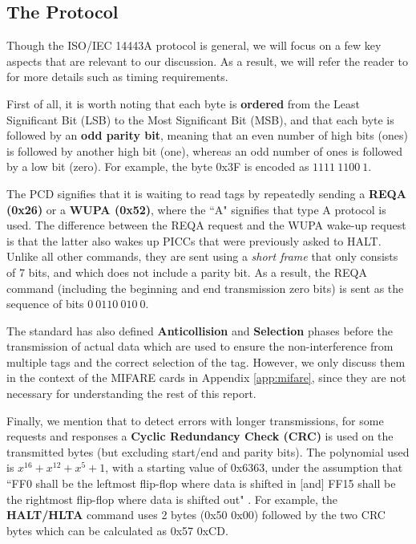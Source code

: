 \documentclass[fleqn,10pt]{SelfArx} %
\begin{document}
\subsection{The Protocol}
\label{subsec:protocol}

Though the ISO/IEC 14443A protocol is general, we will focus on a few key aspects that are relevant to our discussion. As a result, we will refer the reader to \cite{iso144433} for more details such as timing requirements.

First of all, it is worth noting that each byte is {\bf ordered} from the Least Significant Bit (LSB) to the Most Significant Bit (MSB), and that each byte is followed by an {\bf odd parity bit}, meaning that an even number of high bits (ones) is followed by another high bit (one), whereas an odd number of ones is followed by a low bit (zero). For example, the byte 0x3F is encoded as $1111\ 1100\ 1$.

The PCD signifies that it is waiting to read tags by repeatedly sending a {\bf REQA (0x26)} or a {\bf WUPA (0x52)}, where the ``A" signifies that type A protocol is used. The difference between the REQA request and the WUPA wake-up request is that the latter also wakes up PICCs that were previously asked to HALT. Unlike all other commands, they are sent using a {\em short frame} that only consists of 7 bits, and which does not include a parity bit. As a result, the REQA command (including the beginning and end transmission zero bits) is sent as the sequence of bits $0\ 0110\ 010\ 0$.

The standard has also defined {\bf Anticollision} and {\bf Selection} phases before the transmission of actual data which are used to ensure the non-interference from multiple tags and the correct selection of the tag. However, we only discuss them in the context of the MIFARE cards in Appendix \ref{app:mifare}, since they are not necessary for understanding the rest of this report. 

Finally, we mention that to detect errors with longer transmissions, for some requests and responses a {\bf Cyclic Redundancy Check (CRC)} is used on the transmitted bytes (but excluding start/end and parity bits). The polynomial used is $x^{16}+x^{12}+x^5+1$, with a starting value of 0x6363, under the assumption that ``FF0 shall be the leftmost flip-flop where data is shifted in  [and] FF15 shall be the rightmost flip-flop where data is shifted out" \cite{iso144433}. For example, the {\bf HALT/HLTA} command uses 2 bytes (0x50 0x00) followed by the two CRC bytes which can be calculated as 0x57 0xCD.
\end{document}
